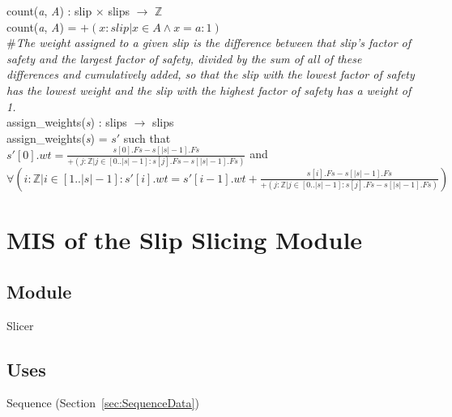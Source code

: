 \documentclass[12pt, titlepage]{article}
\begin{document}
\noindent count(\textit{a}, \textit{A}) : slip $\times$ slips $\rightarrow$ 
$\mathbb{Z}$\\
count(\textit{a}, \textit{A}) = $+(x : slip | x \in A \land x = a : 1)$\\

\noindent \#\textit{The weight assigned to a given slip is the difference 
between that slip's factor of safety and the largest factor of safety, divided 
by the sum of all of these differences and cumulatively added, so that the slip 
with the lowest factor of safety has the lowest weight and the slip with the 
highest factor of safety has a weight of 1.}\\
\noindent assign\_weights(\textit{s}) : slips $\rightarrow$ slips\\
assign\_weights(\textit{s}) = $s'$ such that\\
$s'[0].wt = \frac{s[0].Fs - s[|s|-1].Fs}{+(j : \mathbb{Z} | j \in [0..|s|-1] : 
s[j].Fs - s[|s|-1].Fs)}$ and \\
$\forall(i : \mathbb{Z} | i \in [1..|s|-1] : s'[i].wt = s'[i-1].wt + 
\frac{s[i].Fs - s[|s|-1].Fs}{+(j : \mathbb{Z} | j \in [0..|s|-1] : s[j].Fs - 
s[|s|-1].Fs)})$\\



\newpage
\section{MIS of the Slip Slicing Module} \label{sec:SlicerMod}

\subsection{Module}
Slicer

\subsection{Uses}
Sequence (Section~\ref{sec:SequenceData})
\end{document}
